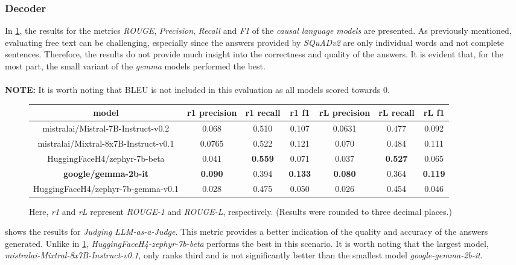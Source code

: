 \documentclass{article}
\begin{document}
\subsubsection*{Decoder}\label{mlresult}
In \cref{causalLMMetrics}, the results for the metrics \textit{ROUGE}, \textit{Precision}, \textit{Recall} and \textit{F1} of the \textit{causal language models} are presented.   As previously mentioned, evaluating free text can be challenging, especially since the answers provided by \textit{SQuADv2} are only individual words and not complete sentences.
Therefore, the results do not provide much insight into the correctness and quality of the answers. It is evident that, for the most part, the small variant of the \textit{gemma} models performed the best.\\
\\
\textbf{NOTE:} It is worth noting that BLEU is not included in this evaluation as all models scored towards 0.
\begin{figure}[H]
    \centering
\begin{tabular}{ |c|c|c|c|c|c|c|  }
 \hline

 model& r1 precision &r1 recall&r1 f1&rL precision&rL recall&rL f1\\
 \hline
 \hline
 mistralai/Mistral-7B-Instruct-v0.2& 0.068&0.510&0.107&0.0631&0.477&0.092\\
 \hline
 mistralai/Mixtral-8x7B-Instruct-v0.1& 0.0765&0.522&0.121&0.070&0.484&0.111\\
 \hline
 HuggingFaceH4/zephyr-7b-beta&0.041&\textbf{0.559}&0.071&0.037&\textbf{0.527}&0.065\\
 \hline
 \textbf{google/gemma-2b-it}& \textbf{0.090}&0.394&\textbf{0.133}&\textbf{0.080}&0.364&\textbf{0.119}\\
 \hline
 HuggingFaceH4/zephyr-7b-gemma-v0.1& 0.028&0.475&0.050&0.026&0.454&0.046\\
 \hline
\end{tabular}
\caption{Here, \textit{r1} and \textit{rL} represent \textit{ROUGE-1} and \textit{ROUGE-L}, respectively. (Results were rounded to three decimal places.)}
\label{causalLMMetrics}
\end{figure}

 shows the results for \textit{Judging LLM-as-a-Judge}. This metric provides a better indication of the quality and accuracy of the answers generated. Unlike in \cref{causalLMMetrics}, \textit{HuggingFaceH4-zephyr-7b-beta} performs the best in this scenario. It is worth noting that the largest model, \textit{mistralai-Mixtral-8x7B-Instruct-v0.1}, only ranks third and is not significantly better than the smallest model \textit{google-gemma-2b-it}.
\end{document}
